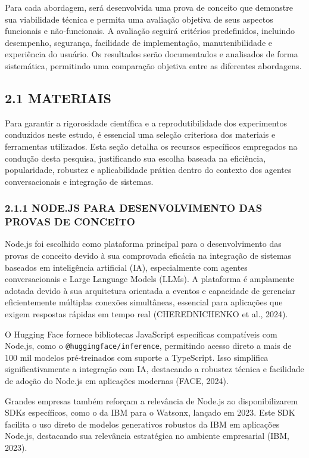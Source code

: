 \documentclass[
]{article}
\begin{document}
Para cada abordagem, será desenvolvida uma prova de conceito que
demonstre sua viabilidade técnica e permita uma avaliação objetiva de
seus aspectos funcionais e não-funcionais. A avaliação seguirá critérios
predefinidos, incluindo desempenho, segurança, facilidade de
implementação, manutenibilidade e experiência do usuário. Os resultados
serão documentados e analisados de forma sistemática, permitindo uma
comparação objetiva entre as diferentes abordagens.

\subsection{2.1 MATERIAIS}\label{materiais}

Para garantir a rigorosidade científica e a reprodutibilidade dos
experimentos conduzidos neste estudo, é essencial uma seleção criteriosa
dos materiais e ferramentas utilizados. Esta seção detalha os recursos
específicos empregados na condução desta pesquisa, justificando sua
escolha baseada na eficiência, popularidade, robustez e aplicabilidade
prática dentro do contexto dos agentes conversacionais e integração de
sistemas.

\subsubsection{2.1.1 NODE.JS PARA DESENVOLVIMENTO DAS PROVAS DE
CONCEITO}\label{node.js-para-desenvolvimento-das-provas-de-conceito}

Node.js foi escolhido como plataforma principal para o desenvolvimento
das provas de conceito devido à sua comprovada eficácia na integração de
sistemas baseados em inteligência artificial (IA), especialmente com
agentes conversacionais e Large Language Models (LLMs). A plataforma é
amplamente adotada devido à sua arquitetura orientada a eventos e
capacidade de gerenciar eficientemente múltiplas conexões simultâneas,
essencial para aplicações que exigem respostas rápidas em tempo real
(CHEREDNICHENKO et al., 2024).

O Hugging Face fornece bibliotecas JavaScript específicas compatíveis
com Node.js, como o \texttt{@huggingface/inference}, permitindo acesso
direto a mais de 100 mil modelos pré-treinados com suporte a TypeScript.
Isso simplifica significativamente a integração com IA, destacando a
robustez técnica e facilidade de adoção do Node.js em aplicações
modernas (FACE, 2024).

Grandes empresas também reforçam a relevância de Node.js ao
disponibilizarem SDKs específicos, como o da IBM para o Watsonx, lançado
em 2023. Este SDK facilita o uso direto de modelos generativos robustos
da IBM em aplicações Node.js, destacando sua relevância estratégica no
ambiente empresarial (IBM, 2023).
\end{document}
